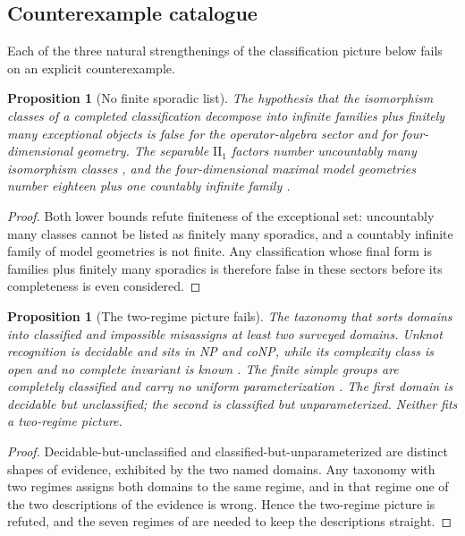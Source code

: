 \documentclass[11pt,letterpaper]{article}
\newtheorem{proposition}[theorem]{Proposition}
\theoremstyle{definition}
\theoremstyle{remark}
\begin{document}
\subsection{Counterexample catalogue}
\label{sec:counterexamples}

Each of the three natural strengthenings of the classification picture below fails on an explicit counterexample.

\begin{proposition}[No finite sporadic list]
\label{prop:sporadic}
The hypothesis that the isomorphism classes of a completed classification decompose into infinite families plus finitely many exceptional objects is false for the operator-algebra sector and for four-dimensional geometry. The separable $\mathrm{II}_1$ factors number uncountably many isomorphism classes \cite{mcduff1969}, and the four-dimensional maximal model geometries number eighteen plus one countably infinite family \cite{geometrization}.
\end{proposition}

\begin{proof}
Both lower bounds refute finiteness of the exceptional set: uncountably many classes cannot be listed as finitely many sporadics, and a countably infinite family of model geometries is not finite. Any classification whose final form is families plus finitely many sporadics is therefore false in these sectors before its completeness is even considered.
\end{proof}

\begin{proposition}[The two-regime picture fails]
\label{prop:tworegime}
The taxonomy that sorts domains into classified and impossible misassigns at least two surveyed domains. Unknot recognition is decidable and sits in NP and coNP, while its complexity class is open and no complete invariant is known \cite{hass1999,lackenby2021}. The finite simple groups are completely classified and carry no uniform parameterization \cite{solomon2001}. The first domain is decidable but unclassified; the second is classified but unparameterized. Neither fits a two-regime picture.
\end{proposition}

\begin{proof}
Decidable-but-unclassified and classified-but-unparameterized are distinct shapes of evidence, exhibited by the two named domains. Any taxonomy with two regimes assigns both domains to the same regime, and in that regime one of the two descriptions of the evidence is wrong. Hence the two-regime picture is refuted, and the seven regimes of  are needed to keep the descriptions straight.
\end{proof}
\end{document}
